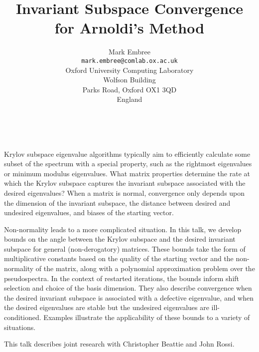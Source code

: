 \documentclass[11pt]{article}
\date{ ~ \hspace{-4mm}}
\title{Invariant Subspace Convergence for Arnoldi's Method  }
\author{Mark Embree \\ {\tt mark.embree@comlab.ox.ac.uk} \\ Oxford University Computing Laboratory  \\  Wolfson Building  \\  Parks Road, Oxford OX1 3QD  \\  England}
\begin{document}
\maketitle
\thispagestyle{empty}





 



Krylov subspace eigenvalue algorithms typically aim to efficiently 
calculate some subset of the spectrum with a special property, such
as the rightmost eigenvalues or minimum modulus eigenvalues.
What matrix properties determine the rate at which the Krylov subspace 
captures the invariant subspace associated with the desired eigenvalues?
When a matrix is normal, convergence only depends upon the dimension
of the invariant subspace, the distance between desired and undesired
eigenvalues, and biases of the starting vector.




Non-normality leads to a more complicated situation.
In this talk, we develop bounds on the angle between the Krylov 
subspace and the desired invariant subspace for general
(non-derogatory) matrices.  
These bounds take the form of multiplicative constants based 
on the quality of the starting vector and the non-normality 
of the matrix, along with a polynomial approximation problem over the pseudospectra.
In the context of restarted iterations, the bounds inform 
shift selection and choice of the basis dimension.
They also describe convergence when the desired invariant subspace
is associated with a defective eigenvalue, and
when the desired eigenvalues are stable but 
the undesired eigenvalues are ill-conditioned.
Examples illustrate the applicability of these bounds
to a variety of situations.




This talk describes joint research with Christopher Beattie and
John Rossi.
\end{document}
